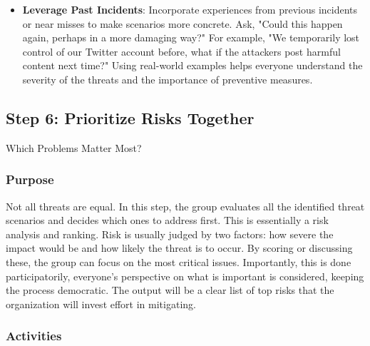 \begin{itemize}
    \item \textbf{Leverage Past Incidents}: Incorporate experiences from previous
    incidents or near misses to make scenarios more concrete. Ask, "Could this
    happen again, perhaps in a more damaging way?" For example, "We temporarily lost
    control of our Twitter account before, what if the attackers post harmful content
    next time?" Using real-world examples helps everyone understand the severity of
    the threats and the importance of preventive measures.

\end{itemize}

\subsection{Step 6: Prioritize Risks Together}
\label{subsec:Step6}

Which Problems Matter Most?

\subsubsection{Purpose}

Not all threats are equal. In this step, the group evaluates all the
identified threat scenarios and decides which ones to address first. This is
essentially a risk analysis and ranking. Risk is usually judged by two factors:
how severe the impact would be and how likely the threat is to occur. By scoring
or discussing these, the group can focus on the most critical issues.
Importantly, this is done participatorily, everyone's perspective on what is
important is considered, keeping the process democratic. The output will be a
clear list of top risks that the organization will invest effort in mitigating.

\subsubsection{Activities}

